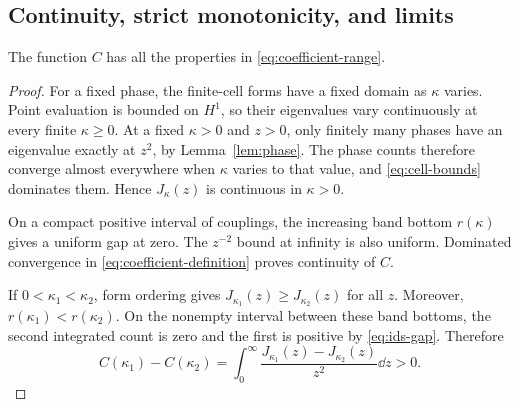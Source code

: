 \subsection{Continuity, strict monotonicity, and limits}

\begin{proposition}
\label{prop:coefficient-range}
The function $C$ has all the properties in
\eqref{eq:coefficient-range}.
\end{proposition}

\begin{proof}
For a fixed phase, the finite-cell forms have a fixed domain
as $\kappa$ varies. Point evaluation is bounded on $H^1$,
so their eigenvalues vary continuously at every finite
$\kappa\ge0$. At a fixed $\kappa>0$ and $z>0$, only
finitely many phases have an eigenvalue exactly at $z^2$,
by Lemma~\ref{lem:phase}. The phase counts therefore converge
almost everywhere when $\kappa$ varies to that value, and
\eqref{eq:cell-bounds} dominates them. Hence $J_\kappa(z)$
is continuous in $\kappa>0$.

On a compact positive interval of couplings, the increasing
band bottom $r(\kappa)$ gives a uniform gap at zero.
The $z^{-2}$ bound at infinity is also uniform.
Dominated convergence in \eqref{eq:coefficient-definition}
proves continuity of $C$.

If $0<\kappa_1<\kappa_2$, form ordering gives
$J_{\kappa_1}(z)\ge J_{\kappa_2}(z)$ for all $z$.
Moreover, $r(\kappa_1)<r(\kappa_2)$. On the nonempty
interval between these band bottoms, the second integrated
count is zero and the first is positive by
\eqref{eq:ids-gap}. Therefore
\begin{equation}
 C(\kappa_1)-C(\kappa_2)
     =\int_0^\infty
          \frac{J_{\kappa_1}(z)-J_{\kappa_2}(z)}{z^2}\dd z>0.
 \label{eq:strict-monotonicity}
\end{equation}


\end{proof}
